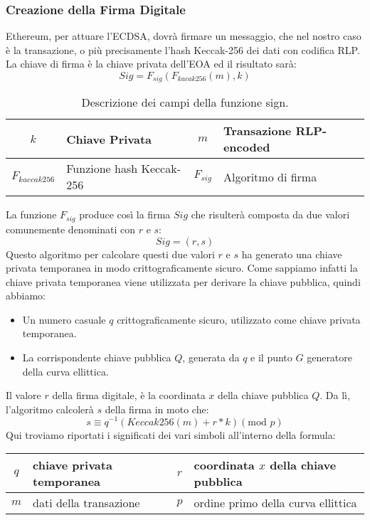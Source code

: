 \subsubsection{Creazione della Firma Digitale}
Ethereum, per attuare l'ECDSA, dovrà firmare un messaggio, che nel nostro caso è la transazione, o più precisamente l'hash Keccak-256 dei dati con codifica RLP. La chiave di firma è la chiave privata dell'EOA ed il risultato sarà:
%
\[ Sig = F_{sig}( F_{kacak256}(m), k ) \]
%
\begin{table}[]
	\centering
	\begin{tabular}{|c|l||c|l|}
		\hline
		$k$ & Chiave Privata & $m$ & Transazione RLP-encoded \\ \hline
		$F_{kaccak256}$ & Funzione hash Keccak-256 & $F_{sig}$ & Algoritmo di firma \\ \hline
	\end{tabular}
\caption{Descrizione dei campi della funzione sign.}
\label{tab:descr_fun_sign}
\end{table}
%
La funzione $F_{sig}$ produce così la firma $Sig$ che risulterà composta da due valori comunemente denominati con $r$ e $s$:
%
\[ Sig = (r, s) \]
%
Questo algoritmo per calcolare questi due valori $r$ e $s$ ha generato una chiave privata temporanea in modo crittograficamente sicuro. Come sappiamo infatti la chiave privata temporanea viene utilizzata per derivare la chiave pubblica, quindi abbiamo:
\begin{itemize}
	\item Un numero casuale $q$ crittograficamente sicuro, utilizzato come chiave privata temporanea.
	\item La corrispondente chiave pubblica $Q$, generata da $q$ e il punto $G$ generatore della curva ellittica.
\end{itemize}
Il valore $r$ della firma digitale, è la coordinata $x$ della chiave pubblica $Q$. Da lì, l'algoritmo calcolerà $s$ della firma in moto che:
%
\[ s \equiv q^{-1} ( Keccak256( m ) + r * k )( \text{mod } p ) \]
%
Qui troviamo riportati i significati dei vari simboli all'interno della formula:
\begin{table}[h]
	\centering
	\begin{tabular}{|c|l||c|l|}
		\hline
		$q$ & chiave privata temporanea & $r$ & coordinata $x$ della chiave pubblica\\ \hline
		$m$ & dati della transazione & $p$ & ordine primo della curva ellittica\\ \hline
	\end{tabular}
\end{table}
